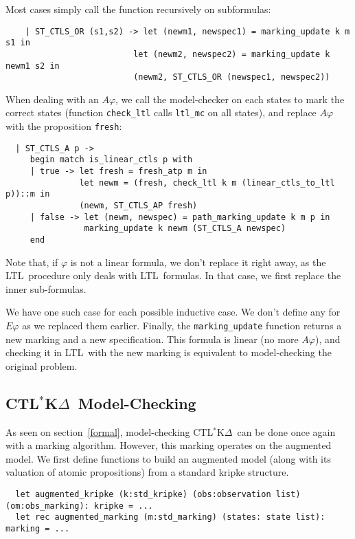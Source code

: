 \documentclass[dvipsnames]{acmart}
\def\ctlskd{CTL$^{*}$K$\Delta$}
\def\ltl{LTL}
\def\A{\mathit{A}}
\def\E{\mathit{E}}
\begin{document}
Most cases simply call the function recursively on subformulas:
\begin{lstlisting}
    | ST_CTLS_OR (s1,s2) -> let (newm1, newspec1) = marking_update k m s1 in
                          let (newm2, newspec2) = marking_update k newm1 s2 in
                          (newm2, ST_CTLS_OR (newspec1, newspec2))
\end{lstlisting}

When dealing with an $\A\varphi$, we call the model-checker on each states to mark the correct states (function \lstinline{check_ltl} calls \lstinline{ltl_mc} on all states), and replace $\A\varphi$ with the proposition \lstinline{fresh}:
\begin{lstlisting}
  | ST_CTLS_A p ->
     begin match is_linear_ctls p with
     | true -> let fresh = fresh_atp m in
               let newm = (fresh, check_ltl k m (linear_ctls_to_ltl p))::m in
               (newm, ST_CTLS_AP fresh)
     | false -> let (newm, newspec) = path_marking_update k m p in
                marking_update k newm (ST_CTLS_A newspec)
     end
\end{lstlisting}
Note that, if $\varphi$ is not a linear formula, we don't replace it right away, as the \ltl\ procedure only deals with \ltl\ formulas. In that case, we first replace the inner sub-formulas.

We have one such case for each possible inductive case. We don't define any for $\E\varphi$ as we replaced them earlier.
Finally, the \lstinline{marking_update} function returns a new marking and a new specification. This formula is linear (no more $\A\varphi$), and checking it in \ltl\ with the new marking is equivalent to model-checking the original problem.

\subsection{\ctlskd\ Model-Checking}
As seen on section~\ref{formal}, model-checking \ctlskd\ can be done once again with a marking algorithm.
However, this marking operates on the augmented model.
We first define functions to build an augmented model (along with its valuation of atomic propositions) from a standard kripke structure.

\begin{lstlisting}
  let augmented_kripke (k:std_kripke) (obs:observation list) (om:obs_marking): kripke = ...
  let rec augmented_marking (m:std_marking) (states: state list): marking = ...
\end{lstlisting}
\end{document}
